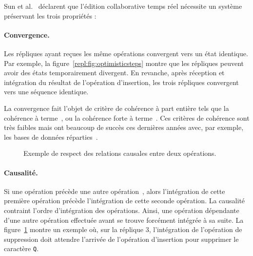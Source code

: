 Sun et al.~\cite{sun1998achieving} déclarent que l'édition collaborative temps
réel nécessite un système préservant les trois propriétés :

\paragraph{Convergence.} Les répliques ayant reçues les même opérations
convergent vers un état identique. Par exemple, la
figure~\ref{repl:fig:optimisticsteps} montre que les répliques peuvent avoir des
états temporairement divergent. En revanche, après réception et intégration du
résultat de l'opération d'insertion, les trois répliques convergent vers une
séquence identique.

\noindent La convergence fait l'objet de critère de cohérence à part entière
tels que la cohérence à terme~\cite{bailis2013eventual}, ou la cohérence forte à
terme~\cite{shapiro2011conflict}. Ces critères de cohérence sont très faibles
mais ont beaucoup de succès ces dernières années avec, par exemple, les bases de
données réparties~\cite{dynamo, riak, cassandra, mongodb}.

\begin{figure}
  \begin{center}
    
    \caption[Exemple de respect des relations
    causales]{\label{repl:fig:causality}Exemple de respect des relations
      causales entre deux opérations.}
  \end{center}
\end{figure}

\paragraph{Causalité.} Si une opération précède une autre
opération~\cite{lamport1978time}, alors l'intégration de cette première
opération précède l'intégration de cette seconde opération.  La causalité
contraint l'ordre d'intégration des opérations. Ainsi, une opération dépendante
d'une autre opération effectuée avant se trouve forcément intégrée à sa suite.
La figure~\ref{repl:fig:causality} montre un exemple où, sur la réplique 3,
l'intégration de l'opération de suppression doit attendre l'arrivée de
l'opération d'insertion pour supprimer le caractère \texttt{Q}.


